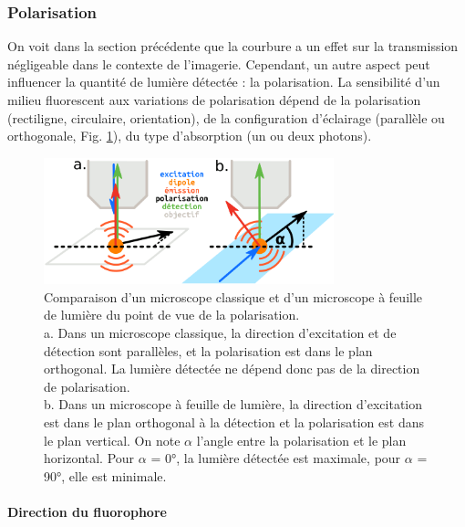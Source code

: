 \subsubsection{Polarisation}

On voit dans la section précédente que la courbure a un effet sur la transmission négligeable dans le contexte de l'imagerie. Cependant, un autre aspect peut influencer la quantité de lumière détectée : la polarisation. La sensibilité d'un milieu fluorescent aux variations de polarisation dépend de la polarisation (rectiligne, circulaire, orientation), de la configuration d'éclairage (parallèle ou orthogonale, Fig. \ref{FIGpolarisation}), du type d'absorption (un ou deux photons).

\begin{figure}[h!]
    \centering
    \includegraphics[width=0.75\textwidth]{./files/polarization_plane.svg.png}
    \caption{Comparaison d'un microscope classique et d'un microscope à feuille de lumière du point de vue de la polarisation.
    \\ a. Dans un microscope classique, la direction d'excitation et de détection sont parallèles, et la polarisation est dans le plan orthogonal. La lumière détectée ne dépend donc pas de la direction de polarisation.
    \\ b. Dans un microscope à feuille de lumière, la direction d'excitation est dans le plan orthogonal à la détection et la polarisation est dans le plan vertical. On note $\alpha$ l'angle entre la polarisation et le plan horizontal. Pour $\alpha$ = 0°, la lumière détectée est maximale, pour $\alpha$ = 90°, elle est minimale.
    \label{FIGpolarisation}}
\end{figure}

\paragraph{Direction du fluorophore}

